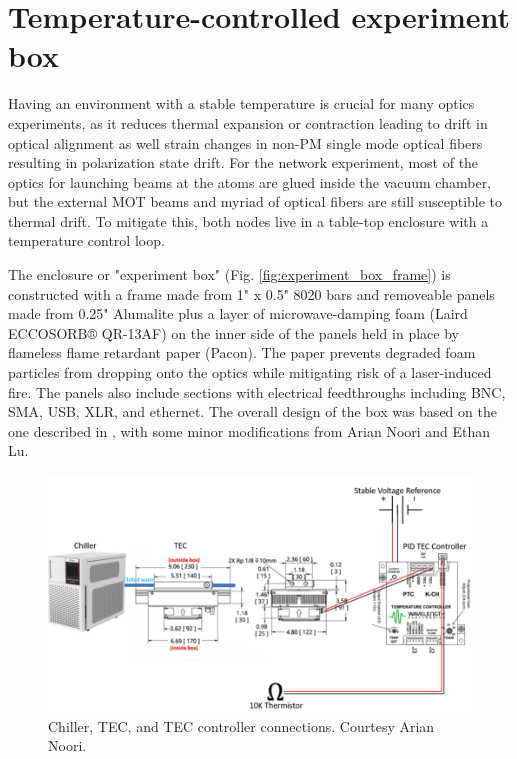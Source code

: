 \chapter{Temperature-controlled experiment box}\label{ch:experiment_box}

Having an environment with a stable temperature is crucial for many optics experiments, as it reduces thermal expansion or contraction leading to drift in optical alignment as well strain changes in non-PM single mode optical fibers resulting in polarization state drift. For the network experiment, most of the optics for launching beams at the atoms are glued inside the vacuum chamber, but the external MOT beams and myriad of optical fibers are still susceptible to thermal drift. To mitigate this, both nodes live in a table-top enclosure with a temperature control loop. 

The enclosure or "experiment box" (Fig. \ref{fig:experiment_box_frame}) is constructed with a frame made from 1" x 0.5" 8020 bars and removeable panels made from 0.25" Alumalite plus a layer of microwave-damping foam (Laird ECCOSORB® QR-13AF) on the inner side of the panels held in place by flameless flame retardant paper (Pacon). The paper prevents degraded foam particles from dropping onto the optics while mitigating risk of a laser-induced fire. The panels also include sections with electrical feedthroughs including BNC, SMA, USB, XLR, and ethernet. The overall design of the box was based on the one described in \cite{kwon2019rydberg}, with some minor modifications from Arian Noori and Ethan Lu.

\begin{figure}[!ht]
    \centering
    \includegraphics[width=1\textwidth]{Images/chiller_TEC_control_diagram.pdf}
    \caption{Chiller, TEC, and TEC controller connections. Courtesy Arian Noori.}
    \label{fig:box_TEC_control}
\end{figure}

